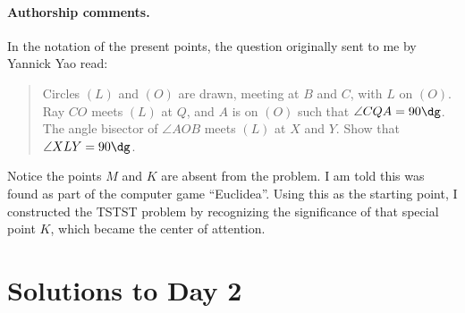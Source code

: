 \documentclass[11pt]{scrartcl}
\begin{document}
\paragraph{Authorship comments.}
In the notation of the present points,
the question originally sent to me by Yannick Yao read:
\begin{quote}
  Circles $(L)$ and $(O)$ are drawn,
  meeting at $B$ and $C$, with $L$ on $(O)$.
  Ray $CO$ meets $(L)$ at $Q$,
  and $A$ is on $(O)$ such that $\angle CQA = 90\dg$.
  The angle bisector of $\angle AOB$ meets $(L)$ at $X$ and $Y$.
  Show that $\angle XLY = 90\dg$.
\end{quote}
Notice the points $M$ and $K$ are absent from the problem.
I am told this was found as part of the computer game ``Euclidea''.
Using this as the starting point,
I constructed the TSTST problem by recognizing the significance
of that special point $K$, which became the center of attention.
\pagebreak

\section{Solutions to Day 2}
\end{document}

